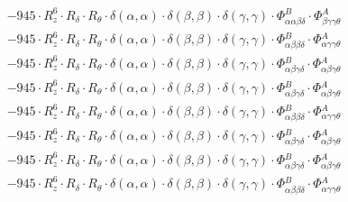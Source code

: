 \documentclass{article}
\begin{document}
\begin{subequations}
\begin{gather}
\begin{array}{c}
 \\[0.2em] 		 - 945 \cdot R_{z}^{6} \cdot R_{\delta{}} \cdot R_{\theta{}} \cdot \delta{}\left(\alpha{}, \alpha{}\right) \cdot \delta{}\left(\beta{}, \beta{}\right) \cdot \delta{}\left(\gamma{}, \gamma{}\right) \cdot \Phi{}^{B}_{\alpha{}\alpha{}\beta{}\delta{}} \cdot \Phi{}^{A}_{\beta{}\gamma{}\gamma{}\theta{}} 
 \\[0.2em] 		 - 945 \cdot R_{z}^{6} \cdot R_{\delta{}} \cdot R_{\theta{}} \cdot \delta{}\left(\alpha{}, \alpha{}\right) \cdot \delta{}\left(\beta{}, \beta{}\right) \cdot \delta{}\left(\gamma{}, \gamma{}\right) \cdot \Phi{}^{B}_{\alpha{}\beta{}\beta{}\delta{}} \cdot \Phi{}^{A}_{\alpha{}\gamma{}\gamma{}\theta{}} 
 \\[0.2em] 		 - 945 \cdot R_{z}^{6} \cdot R_{\delta{}} \cdot R_{\theta{}} \cdot \delta{}\left(\alpha{}, \alpha{}\right) \cdot \delta{}\left(\beta{}, \beta{}\right) \cdot \delta{}\left(\gamma{}, \gamma{}\right) \cdot \Phi{}^{B}_{\alpha{}\beta{}\gamma{}\delta{}} \cdot \Phi{}^{A}_{\alpha{}\beta{}\gamma{}\theta{}} 
 \\[0.2em] 		 - 945 \cdot R_{z}^{6} \cdot R_{\delta{}} \cdot R_{\theta{}} \cdot \delta{}\left(\alpha{}, \alpha{}\right) \cdot \delta{}\left(\beta{}, \beta{}\right) \cdot \delta{}\left(\gamma{}, \gamma{}\right) \cdot \Phi{}^{B}_{\alpha{}\beta{}\gamma{}\delta{}} \cdot \Phi{}^{A}_{\alpha{}\beta{}\gamma{}\theta{}} 
 \\[0.2em] 		 - 945 \cdot R_{z}^{6} \cdot R_{\delta{}} \cdot R_{\theta{}} \cdot \delta{}\left(\alpha{}, \alpha{}\right) \cdot \delta{}\left(\beta{}, \beta{}\right) \cdot \delta{}\left(\gamma{}, \gamma{}\right) \cdot \Phi{}^{B}_{\alpha{}\beta{}\beta{}\delta{}} \cdot \Phi{}^{A}_{\alpha{}\gamma{}\gamma{}\theta{}} 
 \\[0.2em] 		 - 945 \cdot R_{z}^{6} \cdot R_{\delta{}} \cdot R_{\theta{}} \cdot \delta{}\left(\alpha{}, \alpha{}\right) \cdot \delta{}\left(\beta{}, \beta{}\right) \cdot \delta{}\left(\gamma{}, \gamma{}\right) \cdot \Phi{}^{B}_{\alpha{}\beta{}\gamma{}\delta{}} \cdot \Phi{}^{A}_{\alpha{}\beta{}\gamma{}\theta{}} 
 \\[0.2em] 		 - 945 \cdot R_{z}^{6} \cdot R_{\delta{}} \cdot R_{\theta{}} \cdot \delta{}\left(\alpha{}, \alpha{}\right) \cdot \delta{}\left(\beta{}, \beta{}\right) \cdot \delta{}\left(\gamma{}, \gamma{}\right) \cdot \Phi{}^{B}_{\alpha{}\beta{}\gamma{}\delta{}} \cdot \Phi{}^{A}_{\alpha{}\beta{}\gamma{}\theta{}} 
 \\[0.2em] 		 - 945 \cdot R_{z}^{6} \cdot R_{\delta{}} \cdot R_{\theta{}} \cdot \delta{}\left(\alpha{}, \alpha{}\right) \cdot \delta{}\left(\beta{}, \beta{}\right) \cdot \delta{}\left(\gamma{}, \gamma{}\right) \cdot \Phi{}^{B}_{\alpha{}\beta{}\beta{}\delta{}} \cdot \Phi{}^{A}_{\alpha{}\gamma{}\gamma{}\theta{}} 

\end{array}
\end{gather}
\end{subequations}
\end{document}
